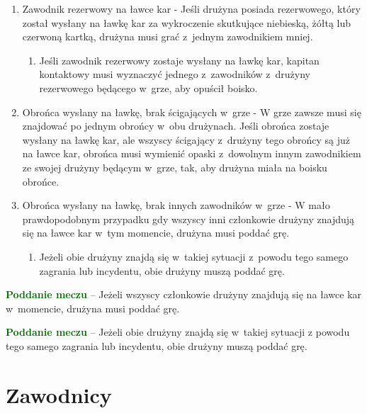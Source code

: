 \documentclass[12pt,a4paper]{article}
\renewcommand{\paragraph}[1]{
  \oldparagraph{#1}%
  \leftskip2.8cm
}
\newcommand\other[1]{\bgroup\textcolor{darkgreen}{\textbf{#1}}}
\begin{document}
\paragraph{Nietypowe sytuacje na ławce kar}

\begin{enumerate}
	\item
	      Zawodnik rezerwowy na ławce kar - Jeśli drużyna posiada rezerwowego,
	      który został wysłany na ławkę kar za wykroczenie skutkujące niebieską,
	      żółtą lub czerwoną kartką, drużyna musi grać z~jednym zawodnikiem
	      mniej.

	      \begin{enumerate}
		      \item
		            Jeśli zawodnik rezerwowy zostaje wysłany na ławkę kar, kapitan
		            kontaktowy musi wyznaczyć jednego z~zawodników z~drużyny rezerwowego
		            będącego w~grze, aby opuścił boisko.
	      \end{enumerate}
	\item
	      Obrońca wysłany na ławkę, brak ścigających w~grze - W grze zawsze musi
	      się znajdować po jednym obrońcy w~obu drużynach. Jeśli obrońca zostaje
	      wysłany na ławkę kar, ale wszyscy ścigający z~drużyny tego obrońcy są
	      już na ławce kar, obrońca musi wymienić opaski z~dowolnym innym
	      zawodnikiem ze swojej drużyny będącym w~grze, tak, aby drużyna miała
	      na boisku obrońce.
	\item
	      Obrońca wysłany na ławkę, brak innych zawodników w~grze - W mało
	      prawdopodobnym przypadku gdy wszyscy inni członkowie drużyny znajdują
	      się na ławce kar w~tym momencie, drużyna musi poddać grę.

	      \begin{enumerate}
		      \item
		            Jeżeli obie drużyny znajdą się w~takiej sytuacji z~powodu tego
		            samego zagrania lub incydentu, obie drużyny muszą poddać grę.
	      \end{enumerate}
\end{enumerate}

\other{Poddanie meczu} -- Jeżeli wszyscy członkowie drużyny znajdują się
na ławce kar w~momencie, drużyna musi poddać grę.

\other{Poddanie meczu} -- Jeżeli obie drużyny znajdą się w~takiej sytuacji
z powodu tego samego zagrania lub incydentu, obie drużyny muszą poddać
grę.


\pagebreak
\section{Zawodnicy}
\end{document}
